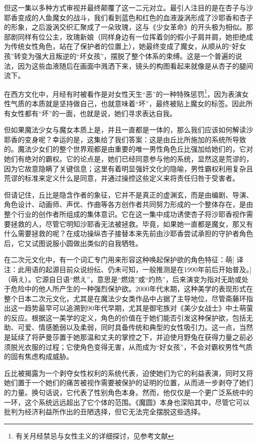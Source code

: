 但这一集以多种方式审视并最终颠覆了这一二元对立。最引人注目的是在杏子与沙耶香变成的人鱼魔女的战斗，我们看到蓝色和红色的血液漩涡形成了沙耶香和杏子的形象，之后漩涡交织汇聚成了一朵玫瑰，这与《少女革命》\cite{ref57}的开头极为相似。那部剧同样有位公主，玫瑰新娘（同样身边有一位挥着剑的假小子肩并肩，她拒绝成为传统女性角色，站在了保护者的位置上），她最终变成了魔女，从顺从的“好女孩”转变为强大且叛逆的“坏女孩”，摆脱了整个体系的束缚\cite{ref58}。这是一个普遍的说法，因为这些血液随后在画面中溅洒下来，镜头的构图看起来就像是从杏子的腿间流下。

在西方文化中，月经有时被看作是对女性天生“恶”的一种特殊惩罚\footnote{有关月经禁忌与女性主义的详细探讨，见参考文献\cite{ref59}}，因为表演女性气质的本质就是坚持做自己，也就意味着“坏”，最终被贴上魔女的标签。因此所有女性都有“坏”的一面，也就是说，她们寻求表达自我。

但如果魔法少女与魔女本质上是，并且一直都是一体的，那么我们应该如何解读沙耶香的变身呢？幸运的是，这集给了我们答案：这是由丘比所施加的系统所导致的。魔法少女们的整个世界观都是由重要的唯一男性角色丘比强加给她们的，它对她们有绝对的霸权。它的论点是，她们已经同意参与他的系统，显然这是荒谬的，因为它故意隐瞒了关键信息；这里有着明显强奸文化的隐喻，男性霸权利用复杂且荒谬的标准来定义什么是同意，并通过操控这些定义来将责任归咎于受害者。

但请记住，丘比是隐含作者的象征，它并不是真正的虚渊玄，而是由编剧、导演、角色设计、动画师、声优、作曲等各方创作者共同努力形成的一个整体存在，是由整个行业的创作者所组成的集体意识。它在这一集中成功诱使杏子将沙耶香视作需要拯救的人，尽管它明知沙耶香无法被拯救。毕竟，如果她一直都是魔女，那又有什么需要拯救的呢？在成功操纵杏子接替本来先前由沙耶香尝试承担的守护者角色后，它又试图说服小圆做出类似的自我牺牲。

在二次元文化中，有一个词汇专门用来形容这种唤起保护欲的角色特征：萌[ 译注：此用语的起源目前众说纷纭、仍未可知，一般推测是在1990年前后开始普及。]（萌え）。它源自日语“燃え”，意思是“燃烧”或“灼热”，后来演变为指对无助或处于危险中的他人所产生的一种强烈保护欲。2000年代末期，这种美学的表现形式在整个日本二次元文化，尤其是在魔法少女类作品中占据了主导地位，尽管斋藤环指出这一趋势最早可以追溯到90年代早期，尤其是御宅族对《美少女战士》\cite{ref19}中土萌萤的反应。根据这一美学的定义，角色的价值在于她们能否引发这种保护欲，包括无助、可爱、情感脆弱以及柔弱，同时具备传统和典型的女性吸引力\cite{ref60}。这一点，当然是延续了将萨曼莎置于她那温和丈夫的掌控之下，并迫使月野兔在获得力量之前必须脱光衣服的过程；它使角色变得无害，从而成为“好女孩”，不会对霸权男性气质的固有焦虑构成威胁。

丘比被揭露为一个剥夺女性权利的系统代表，迫使她们为它的利益表演，同时又将她们置于一个她们的痛苦被视作需要被保护的证明的位置，从而进一步剥夺了她们的力量。换句话说，它代表了性别角色本身。然而，他仅仅是一个更广泛系统中的一环，这个系统远远超出了它个体的范围。《魔圆》本身也深陷其中，尽管它可以批判为经济利益所作出的丑陋选择，但它无法完全摆脱这些选择。

